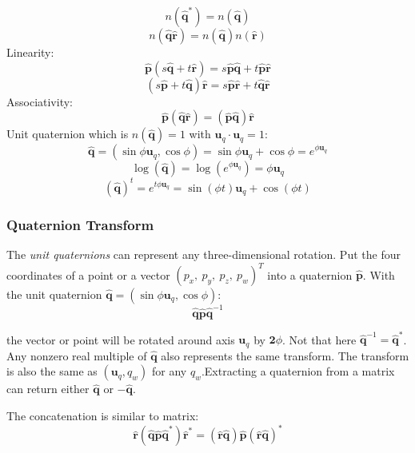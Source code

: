 \documentclass[10pt, a4paper]{article}
\begin{document}
                $$n(\hat{\textbf{q}}^*) = n(\hat{\textbf{q}})$$
                $$n(\hat{\textbf{q}}\hat{\textbf{r}}) = n(\hat{\textbf{q}})n(\hat{\textbf{r}})$$
            \indent Linearity: 
                $$\hat{\textbf{p}}(s\hat{\textbf{q}} + t\hat{\textbf{r}}) = s\hat{\textbf{p}}\hat{\textbf{q}} + t\hat{\textbf{p}}\hat{\textbf{r}}$$
                $$(s\hat{\textbf{p}} + t\hat{\textbf{q}})\hat{\textbf{r}} = s\hat{\textbf{p}}\hat{\textbf{r}} + t\hat{\textbf{q}}\hat{\textbf{r}}$$
            \indent Associativity:
                $$\hat{\textbf{p}}(\hat{\textbf{q}}\hat{\textbf{r}}) = (\hat{\textbf{p}}\hat{\textbf{q}})\hat{\textbf{r}}$$
            \indent Unit quaternion which is $n(\hat{\textbf{q}}) = 1$ with $\textbf{u}_q\cdot\textbf{u}_q = 1$: 
                $$\hat{\textbf{q}} = (\sin{\phi}\textbf{u}_q, \cos{\phi}) = \sin{\phi}\textbf{u}_q + \cos{\phi} = e^{\phi\textbf{u}_q}$$
                $$\log{(\hat{\textbf{q}})} = \log{(e^{\phi\textbf{u}_q})} = \phi\textbf{u}_q$$
                $$(\hat{\textbf{q}})^t = e^{t\phi\textbf{u}_q} = \sin{(\phi t)}\textbf{u}_q + \cos{(\phi t)}$$
        
            \subsubsection{Quaternion Transform}
                The \emph{unit quaternions} can represent any three-dimensional rotation. Put the four coordinates of a point or a vector $(p_x,\ p_y,\ p_z,\ p_w)^T$ into a quaternion $\hat{\textbf{p}}$. With the unit quaternion $\hat{\textbf{q}} = (\sin{\phi}\textbf{u}_q, \cos{\phi})$:
                $$\hat{\textbf{q}}\hat{\textbf{p}}\hat{\textbf{q}}^{-1}$$
                
                the vector or point will be rotated around axis $\textbf{u}_q$ by $\textbf{2$\phi$}$. Not that here $\hat{\textbf{q}}^{-1} = \hat{\textbf{q}}^{*}$. Any nonzero real multiple of $\hat{\textbf{q}}$ also represents the same transform. The transform is also the same as $(\textbf{u}_q, q_w)$ for any $q_w$.Extracting a quaternion from a matrix can return either $\hat{\textbf{q}}$ or $-\hat{\textbf{q}}$.

                The concatenation is similar to matrix: 
                $$\hat{\textbf{r}}(\hat{\textbf{q}}\hat{\textbf{p}}\hat{\textbf{q}}^{*})\hat{\textbf{r}}^{*} = (\hat{\textbf{r}}\hat{\textbf{q}})\hat{\textbf{p}}(\hat{\textbf{r}}\hat{\textbf{q}})^{*}$$
                
\end{document}
